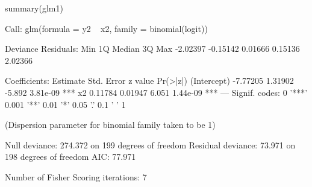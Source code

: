 \begin{Schunk}
\begin{Sinput}
 summary(glm1)
\end{Sinput}
\begin{Soutput}
Call:
glm(formula = y2 ~ x2, family = binomial(logit))

Deviance Residuals: 
     Min        1Q    Median        3Q       Max  
-2.02397  -0.15142   0.01666   0.15136   2.02366  

Coefficients:
            Estimate Std. Error z value Pr(>|z|)    
(Intercept) -7.77205    1.31902  -5.892 3.81e-09 ***
x2           0.11784    0.01947   6.051 1.44e-09 ***
---
Signif. codes:  0 '***' 0.001 '**' 0.01 '*' 0.05 '.' 0.1 ' ' 1 

(Dispersion parameter for binomial family taken to be 1)

    Null deviance: 274.372  on 199  degrees of freedom
Residual deviance:  73.971  on 198  degrees of freedom
AIC: 77.971

Number of Fisher Scoring iterations: 7
\end{Soutput}
\end{Schunk}
